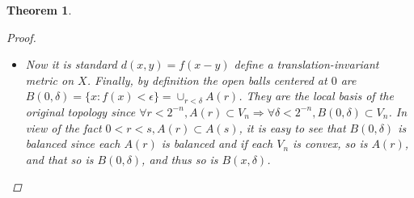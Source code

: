\documentclass{article}
\newtheorem*{theorem}{Theorem}
\begin{document}
\begin{theorem}
\begin{proof}
\begin{itemize}
\begin{itemize}
        \end{itemize}
          \item Now it is standard $d(x, y) = f(x - y)$ define a translation-invariant metric on $X$.
          Finally, by definition the open balls centered at $0$ are $B(0, \delta) = \{x:f(x) < \epsilon\} = \cup_{r < \delta}{A(r)}$.
          They are the local basis of the original topology since $\forall r < 2^{-n}, A(r) \subset V_n \Rightarrow \forall \delta < 2^{-n}, B(0, \delta) \subset V_n$.
          In view of the fact $0 < r < s, A(r) \subset A(s)$, it is easy to see that $B(0, \delta)$ is balanced since each $A(r)$ is balanced
          and if each $V_n$ is convex, so is $A(r)$, and that so is $B(0, \delta)$, and thus so is $B(x, \delta)$.
    \end{itemize}
  \end{proof}
\end{theorem}
\end{document}
